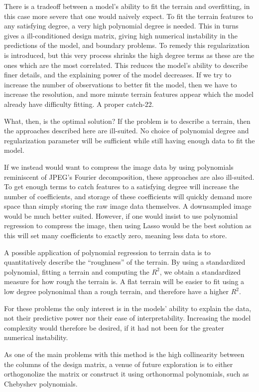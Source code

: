 There is a tradeoff between a model's ability to fit the terrain and
overfitting, in this case more severe that one would naively expect. To fit the
terrain features to any satisfying degree, a very high polynomial degree is
needed. This in turns gives a ill-conditioned design matrix, giving high
numerical instability in the predictions of the model, and boundary problems. To
remedy this regularization is introduced, but this very process shrinks the
high degree terms as these are the ones which are the most correlated. This
reduces the model's ability to describe finer details, and the explaining power
of the model decreases. If we try to increase the number of observations to
better fit the model, then we have to increase the resolution, and more
minute terrain features appear which the model already have difficulty fitting. A proper catch-22.

What, then, is the optimal solution? If the problem is to describe a terrain, then the
approaches described here are ill-suited. No choice of polynomial degree and
regularization parameter will be sufficient while still having enough data to fit the
model.

If we instead would want to compress the image data by using polynomials
reminiscent of JPEG's Fourier decomposition, these approaches are also
ill-suited. To get enough terms to catch features to a satisfying degree will
increase the number of coefficients, and storage of these coefficients will
quickly demand more space than simply storing the raw image data themselves. A
downsampled image would be much better suited. However, if one would insist to
use polynomial regression to compress the image, then using Lasso would be the
best solution as this will set many coefficients to exactly zero, meaning less
data to store. 

A possible application of polynomial regression to terrain data is to
quantitatively describe the ``roughness'' of the terrain. By using a
standardized polynomial, fitting a terrain and computing the \(R^{2}\), we
obtain a standardized measure for how rough the terrain is. A flat terrain will
be easier to fit using a low degree polynonimal than a rough terrain, and
therefore have a higher \(R^{2}\).

For these problems the only interest is in the models' ability to explain the data, not their
predictive power nor their ease of interpretability. Increasing the model
complexity would therefore be desired, if it had not been for the greater
numerical instability.

As one of the main problems with this method is the high collinearity between
the columns of the design matrix, a venue of future exploration is to either
orthogonolize the matrix or construct it using orthonormal polynomials, such as
Chebyshev polynomials. 
